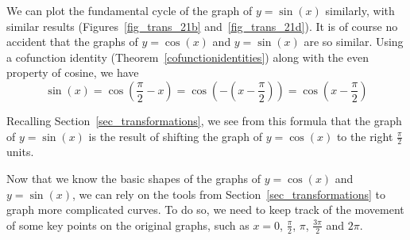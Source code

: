 We can plot the fundamental cycle of the graph of $y = \sin(x)$ similarly, with similar results (Figures~\ref{fig_trans_21b} and~\ref{fig_trans_21d}). It is of course no accident that the graphs of $y = \cos(x)$ and $y = \sin(x)$ are so similar.  Using a cofunction identity (Theorem~\ref{cofunctionidentities}) along with the even property of cosine, we have
\[ \sin(x) = \cos\left(\frac{\pi}{2} - x\right) = \cos\left(-\left(x - \frac{\pi}{2}\right)\right) = \cos\left(x - \frac{\pi}{2}\right)\]





Recalling Section~\ref{sec_transformations}, we see from this formula that the graph of $y=\sin(x)$ is the result of shifting the graph of $y = \cos(x)$ to the right $\frac{\pi}{2}$ units.




Now that we know the basic shapes of the graphs of $y = \cos(x)$ and $y = \sin(x)$, we can rely on the tools from Section~\ref{sec_transformations} to graph more complicated curves.  To do so, we need to keep track of the movement of some key points on the original graphs, such as  $x = 0$, $\frac{\pi}{2}$, $\pi$, $\frac{3\pi}{2}$ and $2\pi$.

